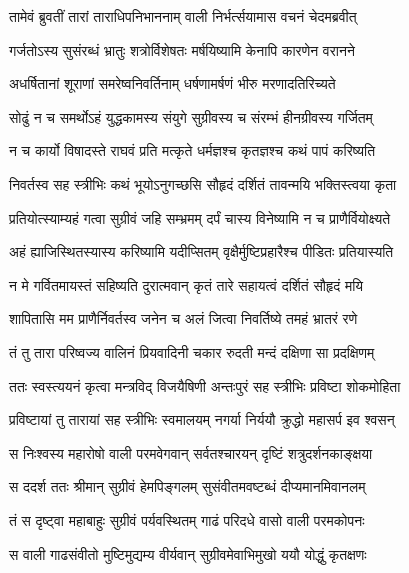 
\twolineshloka
{तामेवं ब्रुवतीं तारां ताराधिपनिभाननाम्}
{वाली निर्भर्त्सयामास वचनं चेदमब्रवीत्} %

\twolineshloka
{गर्जतोऽस्य सुसंरब्धं भ्रातुः शत्रोर्विशेषतः}
{मर्षयिष्यामि केनापि कारणेन वरानने} %

\twolineshloka
{अधर्षितानां शूराणां समरेष्वनिवर्तिनाम्}
{धर्षणामर्षणं भीरु मरणादतिरिच्यते} %

\twolineshloka
{सोढुं न च समर्थोऽहं युद्धकामस्य संयुगे}
{सुग्रीवस्य च संरम्भं हीनग्रीवस्य गर्जितम्} %

\twolineshloka
{न च कार्यो विषादस्ते राघवं प्रति मत्कृते}
{धर्मज्ञश्च कृतज्ञश्च कथं पापं करिष्यति} %

\twolineshloka
{निवर्तस्व सह स्त्रीभिः कथं भूयोऽनुगच्छसि}
{सौहृदं दर्शितं तावन्मयि भक्तिस्त्वया कृता} %

\twolineshloka
{प्रतियोत्स्याम्यहं गत्वा सुग्रीवं जहि सम्भ्रमम्}
{दर्पं चास्य विनेष्यामि न च प्राणैर्वियोक्ष्यते} %

\twolineshloka
{अहं ह्याजिस्थितस्यास्य करिष्यामि यदीप्सितम्}
{वृक्षैर्मुष्टिप्रहारैश्च पीडितः प्रतियास्यति} %

\twolineshloka
{न मे गर्वितमायस्तं सहिष्यति दुरात्मवान्}
{कृतं तारे सहायत्वं दर्शितं सौहृदं मयि} %

\twolineshloka
{शापितासि मम प्राणैर्निवर्तस्व जनेन च}
{अलं जित्वा निवर्तिष्ये तमहं भ्रातरं रणे} %

\twolineshloka
{तं तु तारा परिष्वज्य वालिनं प्रियवादिनी}
{चकार रुदती मन्दं दक्षिणा सा प्रदक्षिणम्} %

\twolineshloka
{ततः स्वस्त्ययनं कृत्वा मन्त्रविद् विजयैषिणी}
{अन्तःपुरं सह स्त्रीभिः प्रविष्टा शोकमोहिता} %

\twolineshloka
{प्रविष्टायां तु तारायां सह स्त्रीभिः स्वमालयम्}
{नगर्या निर्ययौ क्रुद्धो महासर्प इव श्वसन्} %

\twolineshloka
{स निःश्वस्य महारोषो वाली परमवेगवान्}
{सर्वतश्चारयन् दृष्टिं शत्रुदर्शनकाङ्क्षया} %

\twolineshloka
{स ददर्श ततः श्रीमान् सुग्रीवं हेमपिङ्गलम्}
{सुसंवीतमवष्टब्धं दीप्यमानमिवानलम्} %

\twolineshloka
{तं स दृष्ट्वा महाबाहुः सुग्रीवं पर्यवस्थितम्}
{गाढं परिदधे वासो वाली परमकोपनः} %

\twolineshloka
{स वाली गाढसंवीतो मुष्टिमुद्यम्य वीर्यवान्}
{सुग्रीवमेवाभिमुखो ययौ योद्धुं कृतक्षणः} %

